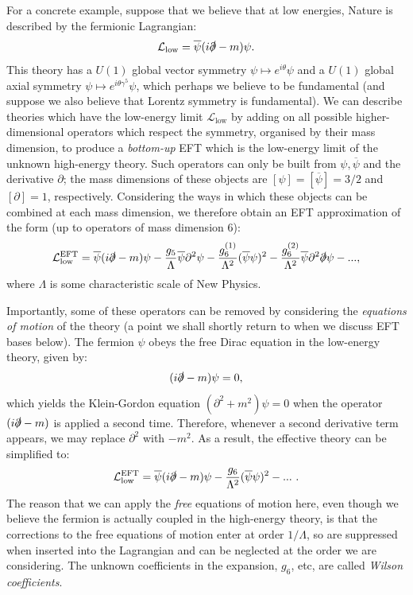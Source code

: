 \documentclass[withindex,glossary]{cam-thesis}
\begin{document}
For a concrete example, suppose that we believe that at low energies, Nature is described by the fermionic Lagrangian:
\begin{equation}
\mathcal{L}_{\text{low}} = \overline{\psi} (i \slashed{\partial} - m) \psi.
\end{equation}
This theory has a $U(1)$ global vector symmetry $\psi \mapsto e^{i\theta}\psi$ and a $U(1)$ global axial symmetry $\psi \mapsto e^{i\theta \gamma^5} \psi$, which perhaps we believe to be fundamental (and suppose we also believe that Lorentz symmetry is fundamental). We can describe theories which have the low-energy limit $\mathcal{L}_{\text{low}}$ by adding on all possible higher-dimensional operators which respect the symmetry, organised by their mass dimension, to produce a \textit{bottom-up} EFT which is the low-energy limit of the unknown high-energy theory. Such operators can only be built from $\psi, \overline{\psi}$ and the derivative $\partial$; the mass dimensions of these objects are $[\psi] = [\overline{\psi}] = 3/2$ and $[\partial] = 1$, respectively. Considering the ways in which these objects can be combined at each mass dimension, we therefore obtain an EFT approximation of the form (up to operators of mass dimension $6$):
\begin{equation}
\label{eq:first_try_bottom_up_eft}
\mathcal{L}_{\text{low}}^{\text{EFT}} = \overline{\psi}(i\slashed{\partial} - m) \psi - \frac{g_5}{\Lambda} \overline{\psi} \partial^2 \psi -  \frac{g_6^{(1)}}{\Lambda^2} (\overline{\psi}\psi)^2 - \frac{g_6^{(2)}}{\Lambda^2} \overline{\psi} \partial^2 \slashed{\partial} \psi - ...,
\end{equation}
where $\Lambda$ is some characteristic scale of New Physics.

Importantly, some of these operators can be removed by considering the \textit{equations of motion} of the theory (a point we shall shortly return to when we discuss EFT bases below). The fermion $\psi$ obeys the free Dirac equation in the low-energy theory, given by:
\begin{equation}
(i \slashed{\partial} - m)\psi = 0,
\end{equation}
which yields the Klein-Gordon equation $(\partial^2 + m^2)\psi = 0$ when the operator $(i\slashed{\partial} - m)$ is applied a second time. Therefore, whenever a second derivative term appears, we may replace $\partial^2$ with $-m^2$. As a result, the effective theory can be simplified to:
\begin{equation}
\label{eq:bottom_up_eft}
\mathcal{L}_{\text{low}}^{\text{EFT}} = \overline{\psi}(i\slashed{\partial} - m) \psi -  \frac{g_6}{\Lambda^2} (\overline{\psi}\psi)^2 - ...\ .
\end{equation}
The reason that we can apply the \textit{free} equations of motion here, even though we believe the fermion is actually coupled in the high-energy theory, is that the corrections to the free equations of motion enter at order $1/\Lambda$, so are suppressed when inserted into the Lagrangian and can be neglected at the order we are considering. The unknown coefficients in the expansion, $g_6$, etc, are called \textit{Wilson coefficients}.
\end{document}
